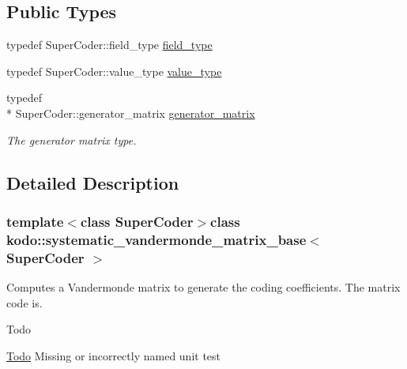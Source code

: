 \subsection*{Public Types}
\begin{DoxyCompactItemize}
\item 
typedef Super\-Coder\-::field\-\_\-type \hyperlink{classkodo_1_1systematic__vandermonde__matrix__base_aff92406ee9428bdc2c8f56de69ff77df}{field\-\_\-type}
\begin{DoxyCompactList}\small\item\em \end{DoxyCompactList}\item 
typedef Super\-Coder\-::value\-\_\-type \hyperlink{classkodo_1_1systematic__vandermonde__matrix__base_ad09eed8f6a55a351b440ba830cde6e25}{value\-\_\-type}
\begin{DoxyCompactList}\small\item\em \end{DoxyCompactList}\item 
\hypertarget{classkodo_1_1systematic__vandermonde__matrix__base_aaf2997cff2b17f25e18b93f26b10eefd}{typedef \\*
Super\-Coder\-::generator\-\_\-matrix \hyperlink{classkodo_1_1systematic__vandermonde__matrix__base_aaf2997cff2b17f25e18b93f26b10eefd}{generator\-\_\-matrix}}\label{classkodo_1_1systematic__vandermonde__matrix__base_aaf2997cff2b17f25e18b93f26b10eefd}

\begin{DoxyCompactList}\small\item\em The generator matrix type. \end{DoxyCompactList}\end{DoxyCompactItemize}


\subsection{Detailed Description}
\subsubsection*{template$<$class Super\-Coder$>$class kodo\-::systematic\-\_\-vandermonde\-\_\-matrix\-\_\-base$<$ Super\-Coder $>$}

Computes a Vandermonde matrix to generate the coding coefficients. The matrix code is. 

\begin{DoxyRefDesc}{Todo}
\item[\hyperlink{todo__todo000048}{Todo}]Missing or incorrectly named unit test \end{DoxyRefDesc}


